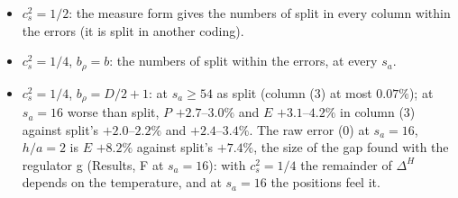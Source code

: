 \documentclass[11pt,aps,preprint,nofootinbib,superscriptaddress,tightenlines]{revtex4-2}
\begin{document}
\begin{itemize}
\item $c_s^2=1/2$: the measure form gives the numbers of split in every column within the errors (it is split in another coding).
\item $c_s^2=1/4$, $b_\rho=b$: the numbers of split within the errors, at every $s_a$.
\item $c_s^2=1/4$, $b_\rho=D/2+1$: at $s_a\ge54$ as split (column (3) at most $0.07\%$); at $s_a=16$ worse than split, $P$ $+2.7$--$3.0\%$ and $E$
  $+3.1$--$4.2\%$ in column (3) against split's $+2.0$--$2.2\%$ and $+2.4$--$3.4\%$.  The raw error (0) at $s_a=16$, $h/a=2$ is $E$ $+8.2\%$ against
  split's $+7.4\%$, the size of the gap found with the regulator g (Results, F at $s_a=16$): with $c_s^2=1/4$ the remainder of $\Delta^H$ depends on
  the temperature, and at $s_a=16$ the positions feel it.
\end{itemize}
\end{document}
